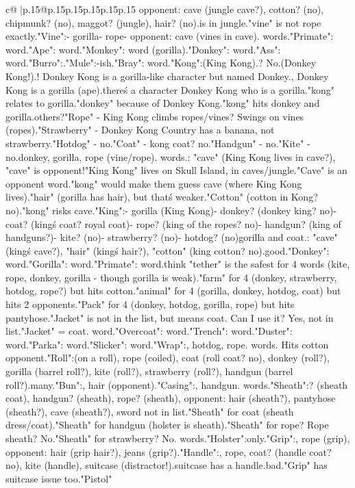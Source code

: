 \documentclass{article}
\begin{document}
{\begin{supertabular}{c@{$\;$}|p{.15\linewidth}@{}p{.15\linewidth}p{.15\linewidth}p{.15\linewidth}p{.15\linewidth}p{.15\linewidth}}
{{{opponent: cave (jungle cave?), cotton? (no), chipmunk? (no), maggot? (jungle), hair? (no).\nMaggot is in jungle.\nAlso "vine" is not rope exactly.\n\n"Vine":\n- gorilla\n- rope\n- opponent: cave (vines in cave). words.\n\n"Primate": word.\n\n"Ape": word.\n\n"Monkey": word (gorilla).\n\n"Donkey": word.\n\n"Ass": word.\n\n"Burro":\nDonkey.\n\n"Mule":\nDonkey-ish.\n\n"Bray": word.\n\n"Kong":\nGorilla (King Kong).\nKite? No.\nDonkey (Donkey Kong!).\nYes! Donkey Kong is a gorilla-like character but named Donkey.\nWait, Donkey Kong is a gorilla (ape).\nAnd there\'s a character Donkey Kong who is a gorilla.\nAnd "kong" relates to gorilla.\nAnd "donkey" because of Donkey Kong.\nSo "kong" hits donkey and gorilla.\nAny others?\n"Rope" - King Kong climbs ropes/vines? Swings on vines (ropes).\n"Strawberry" - Donkey Kong Country has a banana, not strawberry.\n"Hotdog" - no.\n"Coat" - kong coat? no.\n"Handgun" - no.\n"Kite" - no.\nSo donkey, gorilla, rope (vine/rope). words.\nOpponents: "cave" (King Kong lives in cave?), "cave" is opponent!\n"King Kong" lives on Skull Island, in caves/jungle.\n"Cave" is an opponent word.\nSo "kong" would make them guess cave (where King Kong lives).\nAlso "hair" (gorilla has hair), but that\'s weaker.\n"Cotton" (cotton in Kong? no).\nSo "kong" risks cave.\n\n"King":\n- gorilla (King Kong)\n- donkey? (donkey king? no)\n- coat? (king\'s coat? royal coat)\n- rope? (king of the ropes? no)\n- handgun? (king of handguns?)\n- kite? (no)\n- strawberry? (no)\n- hotdog? (no)\nSo gorilla and coat.\nOpponent: "cave" (king\'s cave?), "hair" (king\'s hair?), "cotton" (king cotton? no).\nNot good.\n\n"Donkey": word.\n\n"Gorilla": word.\n\n"Primate": word.\n\nI think "tether" is the safest for 4 words (kite, rope, donkey, gorilla - though gorilla is weak).\nOr "farm" for 4 (donkey, strawberry, hotdog, rope?) but hits cotton.\nOr "animal" for 4 (gorilla, donkey, hotdog, coat) but hits 2 opponents.\n\n"Pack" for 4 (donkey, hotdog, gorilla, rope) but hits pantyhose.\n\n"Jacket" is not in the list, but means coat. Can I use it? Yes, not in list.\n"Jacket" = coat. word.\n\n"Overcoat": word.\n\n"Trench": word.\n\n"Duster": word.\n\n"Parka": word.\n\n"Slicker": word.\n\n"Wrap":\nCoat, hotdog, rope. words. Hits cotton opponent.\n\n"Roll":\nHotdog (on a roll), rope (coiled), coat (roll coat? no), donkey (roll?), gorilla (barrel roll?), kite (roll?), strawberry (roll?), handgun (barrel roll?).\nToo many.\n\n"Bun":\nHotdog, hair (opponent).\n\n"Casing":\nHotdog, handgun. words.\n\n"Sheath":\nCoat? (sheath coat), handgun? (sheath), rope? (sheath), opponent: hair (sheath?), pantyhose (sheath?), cave (sheath?), sword not in list.\n"Sheath" for coat (sheath dress/coat).\n"Sheath" for handgun (holster is sheath).\n"Sheath" for rope? Rope sheath? No.\n"Sheath" for strawberry? No. words.\n\n"Holster":\nHandgun only.\n\n"Grip":\nHandgun, rope (grip), opponent: hair (grip hair?), jeans (grip?).\n\n"Handle":\nHandgun, rope, coat? (handle coat? no), kite (handle), suitcase (distractor!).\nDistractor suitcase has a handle.\nSo bad.\n\n"Grip" has suitcase issue too.\n\n"Pistol" }}}
\end{supertabular}}
\end{document}

